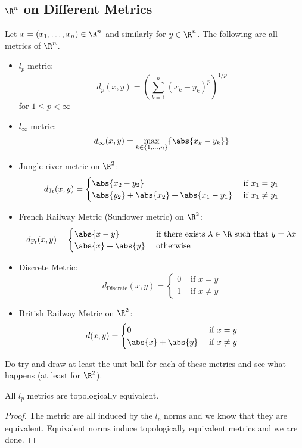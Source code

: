 \subsection{$\R^n$ on Different Metrics}
\begin{thm}{}{} Let $x=(x_1,\dots,x_n)\in\R^n$ and similarly for $y\in\R^n$. The following are all metrics of $\R^n$. 
\begin{itemize}
\item $l_p$ metric: $$d_p(x,y)=\left(\sum_{k=1}^n(x_k-y_k)^p\right)^{1/p}$$ for $1\leq p<\infty$
\item $l_\infty$ metric: $$d_{\infty}(x,y)=\max_{k\in\{1,\dots,n\}}\{\abs{x_k-y_k}\}$$
\item Jungle river metric on $\R^2$: $$d_{\text{Jr}}(x,y)=\begin{cases}
\abs{x_2-y_2} & \text{ if }x_1=y_1\\
\abs{y_2}+\abs{x_2}+\abs{x_1-y_1} & \text{ if }x_1\neq y_1
\end{cases}$$
\item French Railway Metric (Sunflower metric) on $\R^2$: $$d_{\text{Fr}}(x,y)=\begin{cases}
\abs{x-y} & \text{ if there exists $\lambda\in\R$ such that } y=\lambda x\\
\abs{x}+\abs{y} & \text{ otherwise }
\end{cases}$$
\item Discrete Metric: $$d_{\text{Discrete}}(x,y)=\begin{cases}
0 & \text{ if } x=y\\
1 & \text{ if } x\neq y
\end{cases}$$
\item British Railway Metric on $\R^2$: $$d(x,y)=\begin{cases}
0 & \text{ if } x=y\\
\abs{x}+\abs{y} & \text{ if } x\neq y
\end{cases}$$
\end{itemize}
\end{thm}

Do try and draw at least the unit ball for each of these metrics and see what happens (at least for $\R^2$). 

\begin{prp}{}{} All $l_p$ metrics are topologically equivalent. \tcbline
\begin{proof}
The metric are all induced by the $l_p$ norms and we know that they are equivalent. Equivalent norms induce topologically equivalent metrics and we are done. 
\end{proof}
\end{prp}

